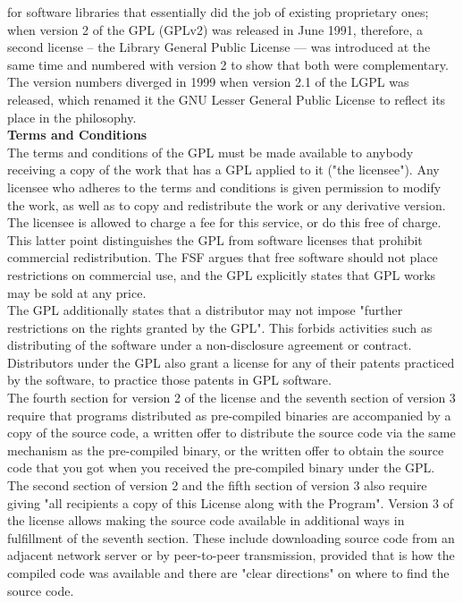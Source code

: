 for software libraries that essentially did the job of existing proprietary ones; when version 2 of the GPL (GPLv2) was released in 
June 1991, therefore, a second license – the Library General Public License — was introduced at the same time and numbered with version 
2 to show that both were complementary. The version numbers diverged in 1999 when version 2.1 of the LGPL was released, which renamed it 
the GNU Lesser General Public License to reflect its place in the philosophy.\\[0.5cm]
\textbf{Terms and Conditions}\\
\hspace*{0.82cm}The terms and conditions of the GPL must be made available to anybody receiving a copy of the work that has a GPL applied to 
it ("the licensee"). Any licensee who adheres to the terms and conditions is given permission to modify the work, as well as to copy and 
redistribute the work or any derivative version. The licensee is allowed to charge a fee for this service, or do this free of charge. This 
latter point distinguishes the GPL from software licenses that prohibit commercial redistribution. The FSF argues that free software should 
not place restrictions on commercial use, and the GPL explicitly states that GPL works may be sold at any price.\\[0.5cm]
\hspace*{0.82cm}The GPL additionally states that a distributor may not impose "further restrictions on the rights granted by the GPL". 
This forbids activities such as distributing of the software under a non-disclosure agreement or contract. Distributors under the GPL 
also grant a license for any of their patents practiced by the software, to practice those patents in GPL software.\\[0.5cm]
\hspace*{0.82cm}The fourth section for version 2 of the license and the seventh section of version 3 require that programs distributed 
as pre-compiled binaries are accompanied by a copy of the source code, a written offer to distribute the source code via the same 
mechanism as the pre-compiled binary, or the written offer to obtain the source code that you got when you received the pre-compiled 
binary under the GPL. The second section of version 2 and the fifth section of version 3 also require giving "all recipients a copy of 
this License along with the Program". Version 3 of the license allows making the source code available in additional ways in fulfillment 
of the seventh section. These include downloading source code from an adjacent network server or by peer-to-peer transmission, provided 
that is how the compiled code was available and there are "clear directions" on where to find the source code.
